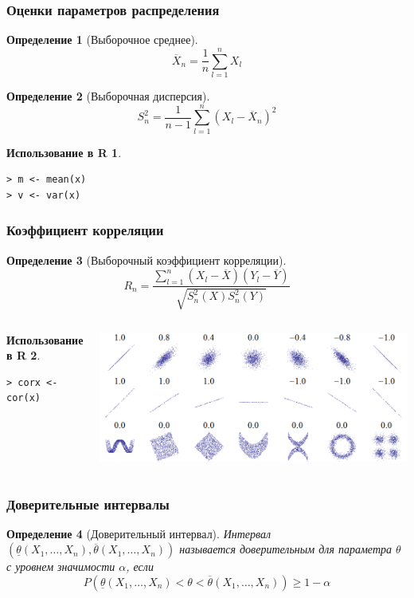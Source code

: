 \documentclass{beamer}
\newtheorem{defn}{Определение}
\newtheorem{exmpr}{Использование в R}
\begin{document}
\begin{frame}[containsverbatim]
\frametitle{Оценки параметров распределения}
\begin{defn}[Выборочное среднее]
$$\overline{X}_n=\frac{1}{n}\sum_{l=1}^n{X_l}$$
\end{defn}
\begin{defn}[Выборочная дисперсия]
$$S_n^2=\frac{1}{n-1}\sum_{l=1}^n{(X_l-\overline{X}_n)^2}$$
\end{defn}
\begin{exmpr}
\begin{verbatim}
> m <- mean(x)
> v <- var(x)
\end{verbatim}
\end{exmpr}
\end{frame}

\begin{frame}[containsverbatim]
\frametitle{Коэффициент корреляции}
\begin{defn}[Выборочный коэффициент корреляции]
$$R_n=\frac{\sum_{l=1}^n{(X_l-\overline{X})(Y_l-\overline{Y})}}{\sqrt{S_n^2(X)S_n^2(Y)}}$$
\end{defn}
\begin{columns}
\begin{exmpr}
\begin{verbatim}
> corx <- cor(x)
\end{verbatim}
\end{exmpr}
\begin{center}
\includegraphics[width=1\textwidth,height=0.35\textheight]{correlation_examples.png}
\end{center}
\end{columns}

\end{frame}

\begin{frame}
\frametitle{Доверительные интервалы}
\begin{defn}[Доверительный интервал]
Интервал $(\underline{\theta}(X_1,\ldots,X_n),\overline{\theta}(X_1,\ldots,X_n))$ называется доверительным для параметра $\theta$ с уровнем значимости $\alpha$, если
$$P(\underline{\theta}(X_1,\ldots,X_n)<\theta<\overline{\theta}(X_1,\ldots,X_n))\geq 1-\alpha$$
\end{defn}
\end{frame}
\end{document}

